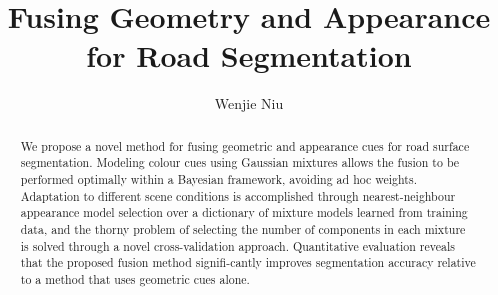 \documentclass[10pt,twocolumn,letterpaper]{article}
\begin{document}
\title{Fusing Geometry and Appearance for Road Segmentation}
\author{Wenjie Niu}
\maketitle

\begin{abstract}
   We propose a novel method for fusing geometric and appearance cues for road surface segmentation. Modeling colour cues using Gaussian mixtures allows the fusion to be performed optimally within a  Bayesian framework, avoiding ad hoc weights. Adaptation to different scene conditions is accomplished through nearest-neighbour appearance model selection over a dictionary of mixture models learned from
 training data, and the thorny problem of selecting the number of components in each mixture is solved through a novel cross-validation approach. Quantitative evaluation reveals that the proposed fusion method signifi-cantly improves segmentation accuracy relative to a method that uses geometric cues alone.\par
\end{abstract}
\end{document}
